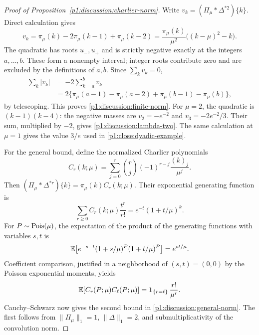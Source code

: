 \begin{proof}[Proof of Proposition~\ref{p1:discussion:charlier-norm}]
Write $v_k=(\Pi_\mu*\Delta^{*2})\{k\}$.  Direct calculation gives
\[
 v_k=\pi_\mu(k)-2\pi_\mu(k-1)+\pi_\mu(k-2)
     =\frac{\pi_\mu(k)}{\mu^2}\bigl((k-\mu)^2-k\bigr).
\]
The quadratic has roots $u_-,u_+$ and is strictly negative
exactly at the integers $a,\ldots,b$.  These form a nonempty
interval; integer roots contribute zero and are excluded by
the definitions of $a,b$.  Since $\sum_kv_k=0$,
\[
 \begin{aligned}
 \sum_k|v_k|
   &=-2\sum_{k=a}^b v_k\\
   &=2\bigl\{\pi_\mu(a-1)-\pi_\mu(a-2)
                 +\pi_\mu(b-1)-\pi_\mu(b)\bigr\},
 \end{aligned}
\]
by telescoping.  This proves \eqref{p1:discussion:finite-norm}.
For $\mu=2$, the quadratic is $(k-1)(k-4)$: the negative
masses are $v_2=-e^{-2}$ and $v_3=-2e^{-2}/3$.
Their sum, multiplied by $-2$, gives
\eqref{p1:discussion:lambda-two}.  The same calculation at
$\mu=1$ gives the value $3/e$ used in
\eqref{p1:close:dyadic-example}.

For the general bound, define the normalized Charlier polynomials
\[
 C_r(k;\mu)=\sum_{j=0}^r
       \binom rj(-1)^{r-j}\frac{(k)_j}{\mu^j}.
\]
Then $(\Pi_\mu*\Delta^{*r})\{k\}=\pi_\mu(k)C_r(k;\mu)$.
Their exponential generating function is
\[
 \sum_{r\ge0}C_r(k;\mu)\frac{t^r}{r!}
       =e^{-t}(1+t/\mu)^k.
\]
For $P\sim\operatorname{Pois}(\mu)$, the expectation of the product of
the generating functions with variables $s,t$ is
\[
 \mathbb E\!\left[e^{-s-t}(1+s/\mu)^P(1+t/\mu)^P\right]
       =e^{st/\mu}.
\]
Coefficient comparison, justified in a neighborhood of
$(s,t)=(0,0)$ by the Poisson exponential moments, yields
\[
 \mathbb E[C_r(P;\mu)C_\ell(P;\mu)]
       =\mathbf 1_{\{r=\ell\}}\,\frac{r!}{\mu^r}.
\]
Cauchy--Schwarz now gives the second bound in
\eqref{p1:discussion:general-norm}.  The first follows from
$\|\Pi_\mu\|_1=1$, $\|\Delta\|_1=2$, and submultiplicativity
of the convolution norm.
\end{proof}
